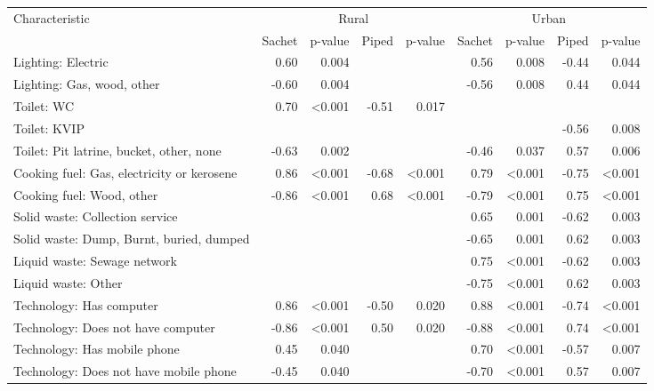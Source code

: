 \begin{tabular}{l r r r r r r r r}
\toprule
Characteristic & \multicolumn{4}{c}{Rural} & \multicolumn{4}{c}{Urban} \\
\cmidrule(lr){2-5}
\cmidrule(lr){6-9}
& Sachet & p-value & Piped & p-value & Sachet & p-value & Piped & p-value \\
\midrule
Lighting: Electric  &  0.60  &  0.004  &    &    &  0.56  &  0.008  &  -0.44  &  0.044  \\
Lighting: Gas, wood, other  &  -0.60  &  0.004  &    &    &  -0.56  &  0.008  &  0.44  &  0.044  \\
Toilet: WC  &  0.70  &  \textless{}0.001  &  -0.51  &  0.017  &    &    &    &    \\
Toilet: KVIP  &    &    &    &    &    &    &  -0.56  &  0.008  \\
Toilet: Pit latrine, bucket, other, none  &  -0.63  &  0.002  &    &    &  -0.46  &  0.037  &  0.57  &  0.006  \\
Cooking fuel: Gas, electricity or kerosene  &  0.86  &  \textless{}0.001  &  -0.68  &  \textless{}0.001  &  0.79  &  \textless{}0.001  &  -0.75  &  \textless{}0.001  \\
Cooking fuel: Wood, other  &  -0.86  &  \textless{}0.001  &  0.68  &  \textless{}0.001  &  -0.79  &  \textless{}0.001  &  0.75  &  \textless{}0.001  \\
Solid waste: Collection service  &    &    &    &    &  0.65  &  0.001  &  -0.62  &  0.003  \\
Solid waste: Dump, Burnt, buried, dumped  &    &    &    &    &  -0.65  &  0.001  &  0.62  &  0.003  \\
Liquid waste: Sewage network  &    &    &    &    &  0.75  &  \textless{}0.001  &  -0.62  &  0.003  \\
Liquid waste: Other  &    &    &    &    &  -0.75  &  \textless{}0.001  &  0.62  &  0.003  \\
Technology: Has computer  &  0.86  &  \textless{}0.001  &  -0.50  &  0.020  &  0.88  &  \textless{}0.001  &  -0.74  &  \textless{}0.001  \\
Technology: Does not have computer  &  -0.86  &  \textless{}0.001  &  0.50  &  0.020  &  -0.88  &  \textless{}0.001  &  0.74  &  \textless{}0.001  \\
Technology: Has mobile phone  &  0.45  &  0.040  &    &    &  0.70  &  \textless{}0.001  &  -0.57  &  0.007  \\
Technology: Does not have mobile phone  &  -0.45  &  0.040  &    &    &  -0.70  &  \textless{}0.001  &  0.57  &  0.007  \\

\end{tabular}
